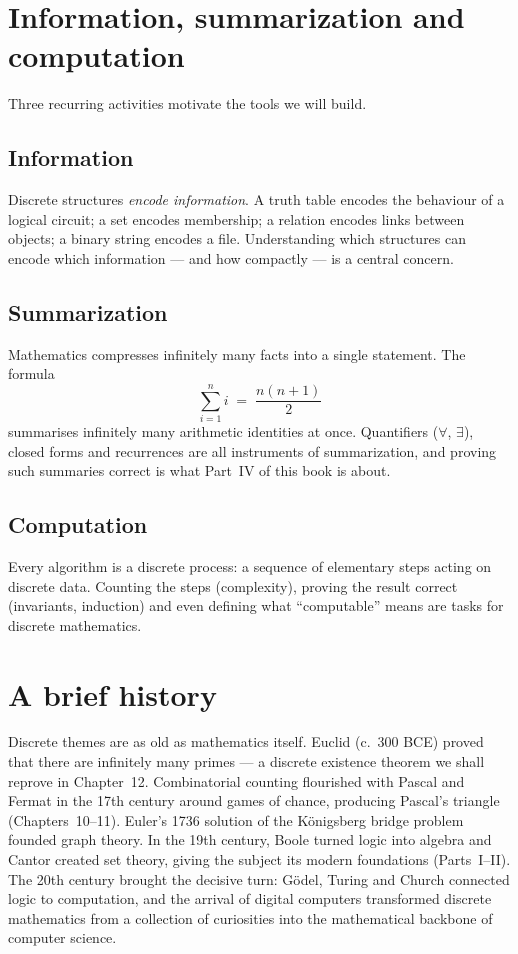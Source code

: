 \section{Information, summarization and computation}

Three recurring activities motivate the tools we will build.

\subsection{Information}
Discrete structures \emph{encode information}. A truth table encodes the
behaviour of a logical circuit; a set encodes membership; a relation encodes
links between objects; a binary string encodes a file. Understanding which
structures can encode which information --- and how compactly --- is a central
concern.

\subsection{Summarization}
Mathematics compresses infinitely many facts into a single statement. The
formula
\[
\sum_{i=1}^{n} i \;=\; \frac{n(n+1)}{2}
\]
summarises infinitely many arithmetic identities at once. Quantifiers
($\forall$, $\exists$), closed forms and recurrences are all instruments of
summarization, and proving such summaries correct is what Part~IV of this book
is about.

\subsection{Computation}
Every algorithm is a discrete process: a sequence of elementary steps acting on
discrete data. Counting the steps (complexity), proving the result correct
(invariants, induction) and even defining what ``computable'' means are tasks
for discrete mathematics.

\section{A brief history}

Discrete themes are as old as mathematics itself. Euclid (c.~300 BCE) proved
that there are infinitely many primes --- a discrete existence theorem we shall
reprove in Chapter~12. Combinatorial counting flourished with Pascal and
Fermat in the 17th century around games of chance, producing Pascal's triangle
(Chapters~10--11). Euler's 1736 solution of the K\"onigsberg bridge problem
founded graph theory. In the 19th century, Boole turned logic into algebra and
Cantor created set theory, giving the subject its modern foundations
(Parts~I--II). The 20th century brought the decisive turn: G\"odel, Turing and
Church connected logic to computation, and the arrival of digital computers
transformed discrete mathematics from a collection of curiosities into the
mathematical backbone of computer science.


